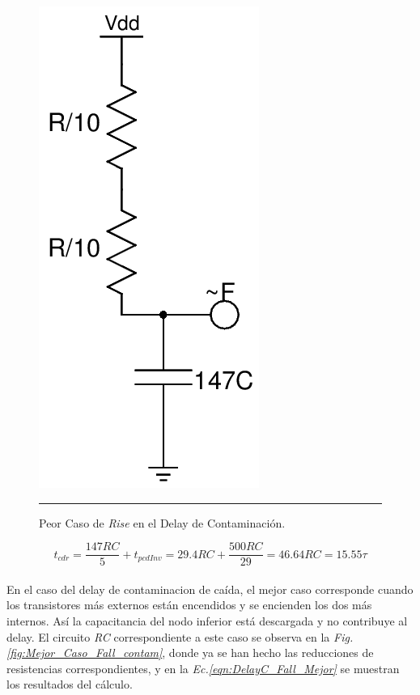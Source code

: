 \documentclass[12pt,a4paper]{article} %
\begin{document}
\begin{figure}[htbp]
  \centering
    \includegraphics[scale=0.4]{./Peor_Caso_Rise_contam.png}
    \rule{35em}{0.3pt}
  \caption[C_Carga]{Peor Caso de \textit{Rise} en el Delay de Contaminación.}
  \label{fig:Peor_Caso_Rise_contam}
\end{figure}

\begin{equation}\label{eqn:DelayC_rise_Peor}
t_{cdr} = \frac{147RC}{5}+t_{pcdInv}=29.4RC+\frac{500RC}{29}=46.64RC=15.55\tau
\end{equation}\\


En el caso del delay de contaminacion de caída, el mejor caso corresponde cuando los transistores más externos están encendidos y se encienden los dos más internos. Así la capacitancia del nodo inferior está descargada y no contribuye al delay. El circuito \textit{RC} correspondiente a este caso se observa en la \textit{Fig.\ref{fig:Mejor_Caso_Fall_contam}}, donde ya se han hecho las reducciones de resistencias correspondientes, y en la \textit{Ec.\ref{eqn:DelayC_Fall_Mejor}} se muestran los resultados del cálculo.\\
\end{document}
